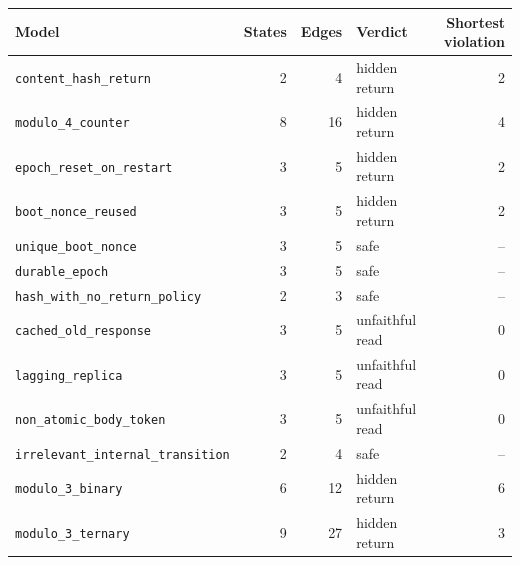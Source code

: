 \begin{tabular}{@{}lrrlr@{}}
\toprule
Model & States & Edges & Verdict & Shortest violation \\
\midrule
\texttt{content\_hash\_return} & 2 & 4 & hidden return & 2 \\
\texttt{modulo\_4\_counter} & 8 & 16 & hidden return & 4 \\
\texttt{epoch\_reset\_on\_restart} & 3 & 5 & hidden return & 2 \\
\texttt{boot\_nonce\_reused} & 3 & 5 & hidden return & 2 \\
\texttt{unique\_boot\_nonce} & 3 & 5 & safe & -- \\
\texttt{durable\_epoch} & 3 & 5 & safe & -- \\
\texttt{hash\_with\_no\_return\_policy} & 2 & 3 & safe & -- \\
\texttt{cached\_old\_response} & 3 & 5 & unfaithful read & 0 \\
\texttt{lagging\_replica} & 3 & 5 & unfaithful read & 0 \\
\texttt{non\_atomic\_body\_token} & 3 & 5 & unfaithful read & 0 \\
\texttt{irrelevant\_internal\_transition} & 2 & 4 & safe & -- \\
\texttt{modulo\_3\_binary} & 6 & 12 & hidden return & 6 \\
\texttt{modulo\_3\_ternary} & 9 & 27 & hidden return & 3 \\
\bottomrule
\end{tabular}
